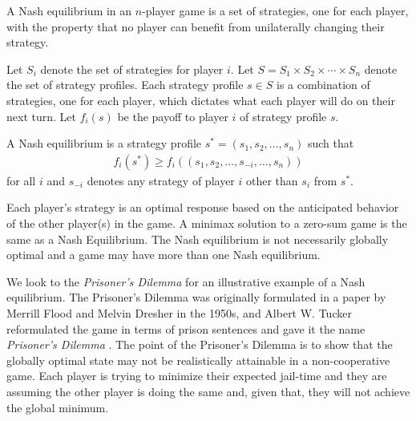 \begin{definition}
  A \textnormal{\sffamily Nash equilibrium} in an $n$-player game is a
  set of strategies, one for each player, with the property that no
  player can benefit from unilaterally changing their strategy.

  Let $S_i$ denote the set of strategies for player $i$. Let
  $S = S_1 \times S_2 \times \cdots \times S_n$ denote the set of
  strategy profiles.  Each strategy profile $s \in S$ is a combination
  of strategies, one for each player, which dictates what each player
  will do on their next turn.  Let $f_i(s)$ be the payoff to player
  $i$ of strategy profile $s$.

  A Nash equilibrium is a strategy profile
  $s^* = (s_1, s_2, \dots, s_n)$ such that
  \begin{align}
  f_i(s^*) \geq f_i((s_1, s_2, \dots, s_{-i}, \dots, s_n))
  \end{align}
  for all $i$ and $s_{-i}$ denotes any strategy of player $i$ other
  than $s_i$ from $s^*$.
\end{definition}

\begin{remark}
  Each player's strategy is an optimal response based on the anticipated
  behavior of the other player(s) in the game. A minimax solution to a zero-sum
  game is the same as a Nash Equilibrium. The Nash equilibrium is not
  necessarily globally optimal and a game may have more than one Nash
  equilibrium.
\end{remark}


We look to the \textit{Prisoner's Dilemma} for an illustrative example of a Nash
equilibrium. The Prisoner's Dilemma was originally formulated in a paper by
Merrill Flood and Melvin Dresher in the 1950s, and Albert W. Tucker reformulated
the game in terms of prison sentences and gave it the name \textit{Prisoner's
  Dilemma} \cite{ref:poundstone}. The point of the Prisoner's Dilemma is to show
that the globally optimal state may not be realistically attainable in a
non-cooperative game. Each player is trying to minimize their expected jail-time
and they are assuming the other player is doing the same and, given that, they
will not achieve the global minimum.

